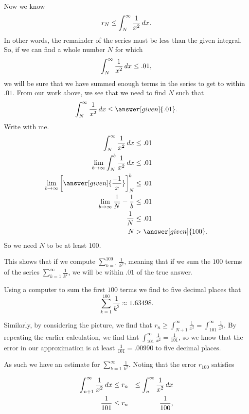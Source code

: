 \documentclass{ximera}
\begin{document}
\begin{model}
\begin{image}
\end{image}
Now we know
\[
r_N \leq \int_N^\infty \frac{1}{x^2} \mathop{}\!d x .
\]
In other words, the remainder of the series must be less than the given integral.  
So, if we can find a whole number $N$ for which
\[
\int_N^\infty \frac{1}{x^2} \mathop{}\!d x \leq .01,
\]
we will be sure that we have summed enough terms in the series to get
to within $.01$.   From our work above, we see that we need to find $N$ such that
    \[
    \int_N^\infty \frac{1}{x^2} \d x \leq \answer[given]{.01}.
    \]
    Write with me.
    \begin{align*}
      \int_N^\infty \frac{1}{x^2} \d x & \leq .01\\
      \lim_{b \to \infty} \int_N^b \frac{1}{x^2} \d x &\leq .01\\
      \lim_{b \to \infty} \eval{\answer[given]{\frac{-1}{x}}}_N^b& \leq .01\\
      \lim_{b \to \infty} \frac{1}{N} - \frac{1}{b}& \leq .01\\
      \frac{1}{N} &\leq .01\\
      N&>\answer[given]{100}.
    \end{align*}
    So we need $N$ to be at least $100$.


This shows that if we compute $\sum_{k=1}^{100} \frac{1}{k^2}$, meaning that if we sum the $100$ terms of the series $\sum_{k=1}^\infty
\frac{1}{k^2}$, we will be within $.01$ of the true answer.

Using a computer to sum the first $100$ terms we find to five decimal places that 
\[
\sum_{k=1}^{100} \frac{1}{k^2} \approx 1.63498.
\]


Similarly, by considering the picture, we find that $r_n \geq \int_{N+1}^\infty \frac{1}{x^2}= \int_{101}^\infty \frac{1}{x^2}$.  By repeating the earlier calculation, we find that $\int_{101}^\infty \frac{1}{x^2} = \frac{1}{101}$, so we know that the error in our approximation is at least $\frac{1}{101} = .00990$ to five decimal places.

As such we have an estimate for $\sum_{k=1}^{\infty} \frac{1}{k^2}$.  Noting that the error $r_{100}$ satisfies

\begin{align*}
\int_{n+1}^{\infty} \frac{1}{x^2} \mathop{}\!d x & \leq  r_n & \leq \int_{n}^{\infty} \frac{1}{x^2} \mathop{}\!d x \\
\frac{1}{101} & \leq  r_n & \frac{1}{100}, \\
\end{align*}


\end{model}
\end{document}
